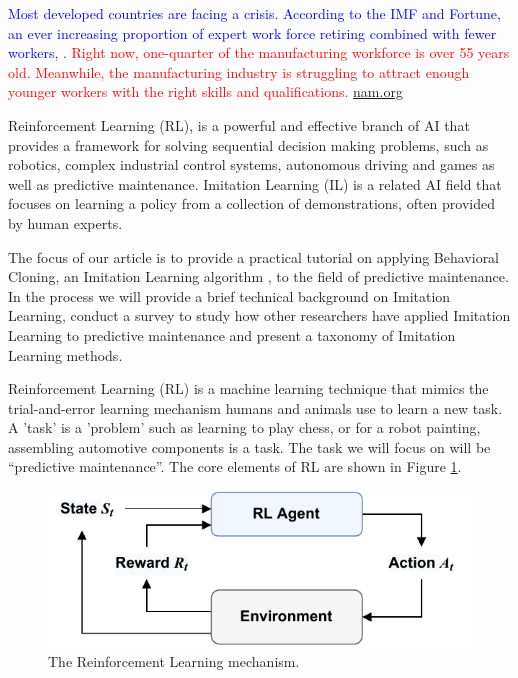 \documentclass{article}
\begin{document}
\textcolor{blue}{Most developed countries are facing a crisis. According to the IMF and Fortune, an ever increasing proportion of expert work force retiring combined with fewer workers}, \citep{Prakash2024Germanys, Fletcher2024Germanys}. \textcolor{red}{Right now, one-quarter of the manufacturing workforce is over 55 years old. Meanwhile, the manufacturing industry is struggling to attract enough younger workers with the right skills and qualifications.} \href{https://nam.org/new-report-dives-into-retaining-the-aging-manufacturing-workforce-5579/?stream=workforce}{nam.org}

Reinforcement Learning (RL), is a powerful and effective branch of AI that provides a framework for solving sequential decision making problems, such as robotics, complex industrial control systems, autonomous driving and games as well as predictive maintenance. Imitation Learning (IL) is a related AI field that focuses on learning a policy from a collection of demonstrations, often provided by human experts. 

The focus of our article is to provide a practical tutorial on applying Behavioral Cloning, an Imitation Learning algorithm , to the field of predictive maintenance. In the process we will provide a brief technical background on Imitation Learning, conduct a survey to study how other researchers have applied Imitation Learning to predictive maintenance and present a taxonomy of Imitation Learning methods.  

Reinforcement Learning (RL) is a machine learning technique that mimics the trial-and-error learning mechanism humans and animals use to learn a new task. A 'task' is a 'problem' such as learning to play chess, or for a robot painting, assembling automotive components is a task. The task we will focus on will be ``predictive maintenance''. The core elements of RL are shown in Figure \ref{fig:RL}.
\begin{figure}[h]
	\centering
	\includegraphics[width=0.5\linewidth]{images/RL-loop.pdf}
	\caption{The Reinforcement Learning mechanism.}
	\label{fig:RL}
\end{figure}
\end{document}
